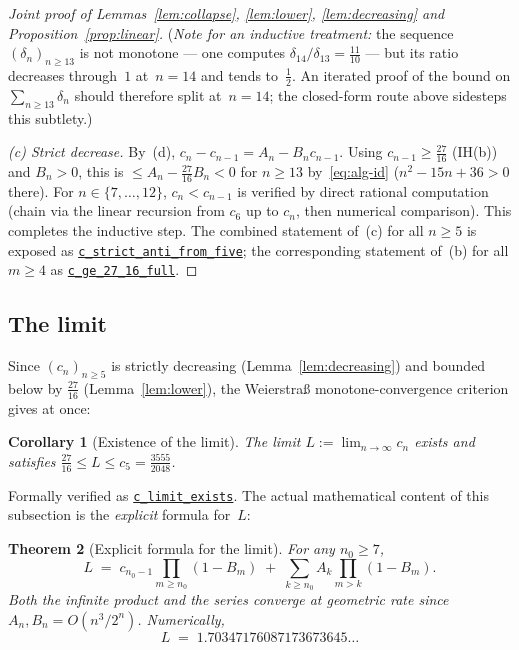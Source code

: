 \documentclass[12pt]{article}
\newtheorem{theorem}{Theorem}[section]
\newtheorem{corollary}[theorem]{Corollary}
\theoremstyle{definition}
\theoremstyle{remark}
\begin{document}
\begin{proof}[Joint proof of Lemmas~\ref{lem:collapse},
  \ref{lem:lower}, \ref{lem:decreasing} and Proposition~\ref{prop:linear}]
  (\emph{Note for an inductive treatment:} the sequence
  $(\delta_n)_{n\ge 13}$ is not monotone — one computes
  $\delta_{14}/\delta_{13}=\tfrac{11}{10}$ — but its ratio
  decreases through~$1$ at~$n=14$ and tends to~$\tfrac12$.  An
  iterated proof of the bound on $\sum_{n\ge 13}\delta_n$ should
  therefore split at~$n=14$; the closed-form route above sidesteps
  this subtlety.)

  \emph{(c) Strict decrease.}  By~(d), $c_n-c_{n-1}=A_n-B_nc_{n-1}$.
  Using $c_{n-1}\ge\tfrac{27}{16}$ (IH(b)) and $B_n>0$, this is
  $\le A_n-\tfrac{27}{16}B_n<0$ for $n\ge 13$ by~\eqref{eq:alg-id}
  ($n^2-15n+36>0$ there).  For $n\in\{7,\dots,12\}$, $c_n<c_{n-1}$
  is verified by direct rational computation (chain via the linear
  recursion from $c_6$ up to $c_n$, then numerical comparison).
  This completes the inductive step.  The combined statement of~(c)
  for all $n\ge 5$ is exposed as
  \href{https://github.com/pfaffelh/coins/blob/c60bcd3/CoinsLean/CoinsLean/Perturbation.lean\#L1488}{\texttt{c\_strict\_anti\_from\_five}};
  the corresponding statement of~(b) for all $m\ge 4$ as
  \href{https://github.com/pfaffelh/coins/blob/c60bcd3/CoinsLean/CoinsLean/Perturbation.lean\#L1483}{\texttt{c\_ge\_27\_16\_full}}.
\end{proof}

\subsection{The limit}

Since $(c_n)_{n\ge 5}$ is strictly decreasing
(Lemma~\ref{lem:decreasing}) and bounded below by $\tfrac{27}{16}$
(Lemma~\ref{lem:lower}), the Weierstra\ss{} monotone-convergence
criterion gives at once:

\begin{corollary}[Existence of the limit]\label{cor:L-exists}
  The limit $L:=\lim_{n\to\infty}c_n$ exists and satisfies
  $\tfrac{27}{16}\le L\le c_5=\tfrac{3555}{2048}$.
\end{corollary}

\noindent
Formally verified as
\href{https://github.com/pfaffelh/coins/blob/c60bcd3/CoinsLean/CoinsLean/Perturbation.lean\#L1517}{\texttt{c\_limit\_exists}}.
The actual mathematical content of this subsection is the
\emph{explicit} formula for~$L$:

\begin{theorem}[Explicit formula for the limit]\label{thm:limit}
  For any $n_0\ge 7$,
  \begin{equation}\label{eq:L-formula}
    L \;=\; c_{n_0-1}\prod_{m\ge n_0}(1-B_m)
    \;+\; \sum_{k\ge n_0}A_k\prod_{m>k}(1-B_m).
  \end{equation}
  Both the infinite product and the series converge at geometric
  rate since $A_n,B_n=O(n^3/2^n)$.  Numerically,
  \begin{equation}\label{eq:L-value}
    L \;=\; 1.70347176087173673645\ldots
  \end{equation}
\end{theorem}
\end{document}
